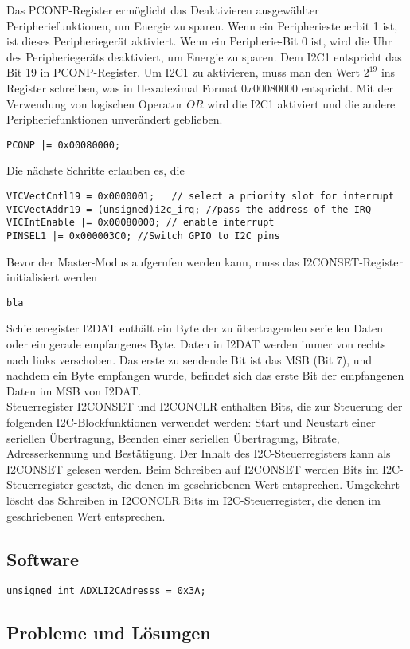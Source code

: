 Das PCONP-Register ermöglicht das Deaktivieren ausgewählter Peripheriefunktionen, um Energie zu sparen. Wenn ein Peripheriesteuerbit 1 ist, ist dieses Peripheriegerät aktiviert. Wenn ein Peripherie-Bit 0 ist, wird die Uhr des Peripheriegeräts deaktiviert, um Energie zu sparen. Dem I2C1 entspricht das Bit 19 in PCONP-Register. Um I2C1 zu aktivieren, muss man den Wert $2^{19}$ ins Register schreiben, was in Hexadezimal Format $0x00080000$ entspricht. Mit der Verwendung von logischen Operator $OR$ wird die I2C1 aktiviert und die andere Peripheriefunktionen unverändert geblieben.
\begin{lstlisting}
PCONP |= 0x00080000;
\end{lstlisting}
Die nächste Schritte erlauben es, die 
\begin{lstlisting}
VICVectCntl19 = 0x0000001;   // select a priority slot for interrupt
VICVectAddr19 = (unsigned)i2c_irq; //pass the address of the IRQ
VICIntEnable |= 0x00080000; // enable interrupt
PINSEL1 |= 0x000003C0; //Switch GPIO to I2C pins
\end{lstlisting}

Bevor der Master-Modus aufgerufen werden kann, muss das I2CONSET-Register initialisiert werden

\begin{lstlisting}
bla

\end{lstlisting}

Schieberegister I2DAT enthält ein Byte der zu übertragenden seriellen Daten oder ein gerade empfangenes Byte. Daten in I2DAT werden immer von rechts nach links verschoben. Das erste zu sendende Bit ist das MSB (Bit 7), und nachdem ein Byte empfangen wurde, befindet sich das erste Bit der empfangenen Daten im MSB von I2DAT. \\

Steuerregister I2CONSET und I2CONCLR enthalten Bits, die zur Steuerung der folgenden I2C-Blockfunktionen verwendet werden: Start und Neustart einer seriellen Übertragung, Beenden einer seriellen Übertragung, Bitrate, Adresserkennung und Bestätigung. Der Inhalt des I2C-Steuerregisters kann als I2CONSET gelesen werden. Beim Schreiben auf I2CONSET werden Bits im I2C-Steuerregister gesetzt, die denen im geschriebenen Wert entsprechen. Umgekehrt löscht das Schreiben in I2CONCLR Bits im I2C-Steuerregister, die denen im geschriebenen Wert entsprechen.\\

\subsection{Software}

\begin{lstlisting}
unsigned int ADXLI2CAdresss = 0x3A;

\end{lstlisting}


\subsection{Probleme und Lösungen}